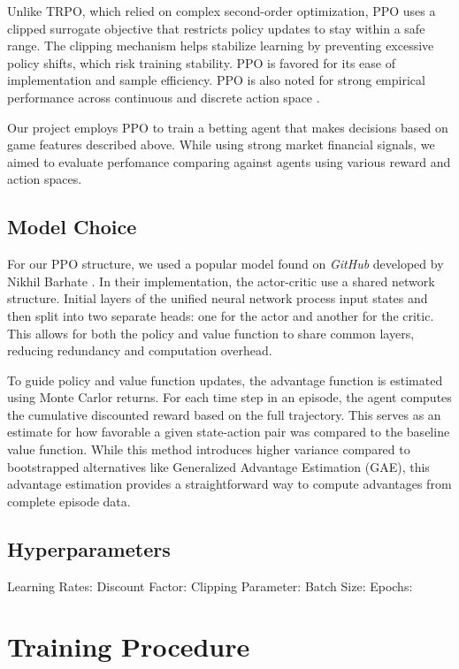 \documentclass[sigconf]{acmart}
\begin{document}
Unlike TRPO, which relied on complex second-order optimization, PPO uses a clipped surrogate objective that restricts policy updates to stay within a safe range. The clipping mechanism helps stabilize learning by preventing excessive policy shifts, which risk training stability. PPO is favored for its ease of implementation and sample efficiency. PPO is also noted for strong empirical performance across continuous and discrete action space \cite{schulman2017proximalpolicyoptimizationalgorithms}.

Our project employs PPO to train a betting agent that makes decisions based on game features described above. While using strong market financial signals, we aimed to evaluate perfomance comparing against agents using various reward and action spaces.

\subsection{Model Choice}

   For our PPO structure, we used a popular model found on \textit{GitHub} developed by Nikhil Barhate \cite{barhate2020ppo}. In their implementation, the actor-critic use a shared network structure. Initial layers of the unified neural network process input states and then split into two separate heads: one for the actor and another for the critic. This allows for both the policy and value function to share common layers, reducing redundancy and computation overhead.

   To guide policy and value function updates, the advantage function is estimated using Monte Carlor returns. For each time step in an episode, the agent computes the cumulative discounted reward based on the full trajectory. This serves as an estimate for how favorable a given state-action pair was compared to the baseline value function. While this method introduces higher variance compared to bootstrapped alternatives like Generalized Advantage Estimation (GAE), this advantage estimation provides a straightforward way to compute advantages from complete episode data. 

\subsection{Hyperparameters}
Learning Rates: 
Discount Factor:
Clipping Parameter:
  Batch Size:
  Epochs:

\section{Training Procedure}
\end{document}

